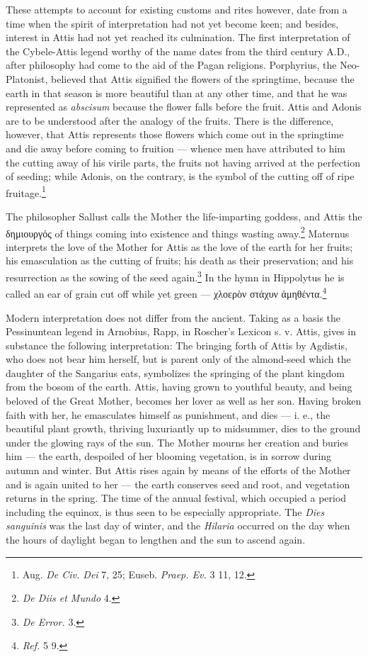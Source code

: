 \documentclass[a4paper, 11pt, oneside, polutonikogreek, english]{article}
\begin{document}
These attempts to account for existing customs and rites however, date from a time when the spirit of interpretation had not yet become keen; and besides, interest in Attis had not yet reached its culmination. The first interpretation of the Cybele-Attis legend worthy of the name dates from the third century \textsc{A.D.}, after philosophy had come to the aid of the Pagan religions. Porphyrius, the Neo-Platonist, believed that Attis signified the flowers of the springtime, because the earth in that season is more beautiful than at any other time, and that he was represented as \emph{abscisum} because the flower falls before the fruit. Attis and Adonis are to be understood after the analogy of the fruits. There is the difference, however, that Attis represents those flowers which come out in the springtime and die away before coming to fruition --- whence men have attributed to him the cutting away of his virile parts, the fruits not having arrived at the perfection of seeding; while Adonis, on the contrary, is the symbol of the cutting off of ripe fruitage.\footnote{Aug. \emph{De Civ. Dei} 7, 25; Euseb. \emph{Praep. Ev.} 3 11, 12.}

The philosopher Sallust calls the Mother the life-imparting goddess, and Attis the δημιουργός of things coming into existence and things wasting away.\footnote{\emph{De Diis et Mundo} 4.} Maternus interprets the love of the Mother for Attis as the love of the earth for her fruits; his emasculation as the cutting of fruits; his death as their preservation; and his resurrection as the sowing of the seed again.\footnote{\emph{De Error.} 3.} In the hymn in Hippolytus he is called an ear of grain cut off while yet green --- χλοερὸν στάχυν ἀμηθέντα.\footnote{\emph{Ref.} 5 9.}

Modern interpretation does not differ from the ancient. Taking as a basis the Pessinuntean legend in Arnobius, Rapp, in Roscher's Lexicon s. v. Attis, gives in substance the following interpretation: The bringing forth of Attis by Agdistis, who does not bear him herself, but is parent only of the almond-seed which the daughter of the Sangarius eats, symbolizes the springing of the plant kingdom from the bosom of the earth. Attis, having grown to youthful beauty, and being beloved of the Great Mother, becomes her lover as well as her son. Having broken faith with her, he emasculates himself as punishment, and dies --- i. e., the beautiful plant growth, thriving luxuriantly up to midsummer, dies to the ground under the glowing rays of the sun. The Mother mourns her creation and buries him --- the earth, despoiled of her blooming vegetation, is in sorrow during autumn and winter. But Attis rises again by means of the efforts of the Mother and is again united to her --- the earth conserves seed and root, and vegetation returns in the spring. The time of the annual festival, which occupied a period including the equinox, is thus seen to be especially appropriate. The \emph{Dies sanguinis} was the last day of winter, and the \emph{Hilaria} occurred on the day when the hours of daylight began to lengthen and the sun to ascend again.
\end{document}
